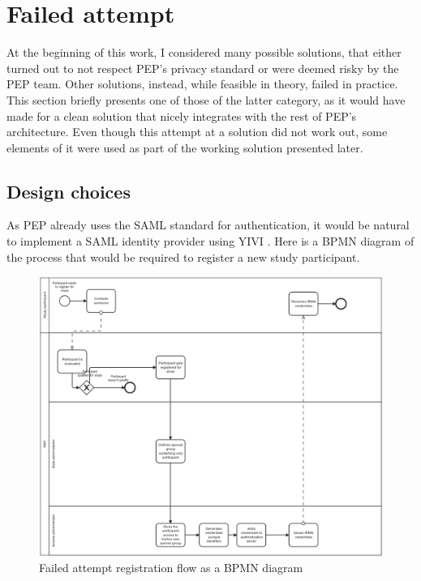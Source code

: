 \documentclass{report}
\begin{document}
\section{Failed attempt}
At the beginning of this work, I considered many possible solutions, that either turned out to not respect PEP's privacy standard or were deemed risky by the PEP team. Other
solutions, instead, while feasible in theory, failed in practice. This section briefly presents one of those of the latter category, as it would have made for a clean solution that
nicely integrates with the rest of PEP's architecture. Even though this attempt at a solution did not work out, some elements of it were used as part of the working solution
presented later.\par

\subsection{Design choices}
As PEP already uses the SAML standard \cite{sstc-saml-core-errata-2.0-wd-07} for authentication, it would be natural to implement a SAML identity provider using YIVI \cite{irma-app}.
Here is a BPMN diagram of the process that would be required to register a new study participant.

\begin{figure}[H]
	\includegraphics[scale=0.3]{registration_flow.png}
	\caption{Failed attempt registration flow as a BPMN diagram}
	\label{bpmn-registration-flow}
\end{figure}
\end{document}
